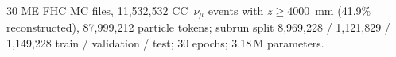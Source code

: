 30 ME FHC MC files, 11{,}532{,}532 CC~$\nu_\mu$ events with $z \ge 4000$~mm (41.9\% reconstructed), 87{,}999{,}212 particle tokens; subrun split 8{,}969{,}228 / 1{,}121{,}829 / 1{,}149{,}228 train / validation / test; 30 epochs; 3.18\,M parameters.
